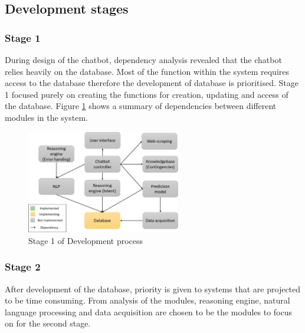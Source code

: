 \documentclass[11pt]{article}
\begin{document}
\subsection{Development stages} \label{Dev. stages}
\subsubsection{Stage 1}
During design of the chatbot, dependency analysis revealed that the chatbot relies heavily on the database. Most of the function within the system requires access to the database therefore the development of database is prioritised. Stage 1 focused purely on creating the functions for creation, updating and access of the database. Figure \ref{fig:Stage 1} shows a summary of dependencies between different modules in the system.
\begin{figure}[!htb]
	\centering
	\includegraphics[width=0.6\textwidth]{Stage_1}
	\caption{Stage 1 of Development process }\label{fig:Stage 1}
\end{figure}

\subsubsection{Stage 2}
After development of the database, priority is given to systems that are projected to be time consuming. From analysis of the modules, reasoning engine, natural language processing and data acquisition are chosen to be the modules to focus on for the second stage. 
\end{document}

